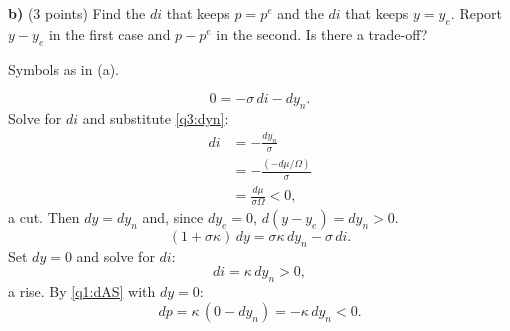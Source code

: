 \textbf{b)} (3 points) Find the $di$ that keeps $p=p^e$ and the $di$ that keeps $y=y_e$. Report $y-y_e$ in the first case and $p-p^e$ in
the second. Is there a trade-off?
\resolespaco
\begin{sol}
\begin{notacao}
\item Symbols as in (a).
\end{notacao}
\begin{equation}
0=-\sigma\,di-dy_n . \nonumber
\end{equation}
Solve for $di$ and substitute \eqref{q3:dyn}:
\begin{align}
di&=-\frac{dy_n}{\sigma}\nonumber\\
&=-\frac{(-d\mu/\Omega)}{\sigma}\nonumber\\
&=\frac{d\mu}{\sigma\Omega}<0 , \label{q3:dips}
\end{align}
a cut. Then $dy=dy_n$ and, since $dy_e=0$, $d(y-y_e)=dy_n>0$.
\begin{equation}
(1+\sigma\kappa)\,dy=\sigma\kappa\,dy_n-\sigma\,di . \nonumber
\end{equation}
Set $dy=0$ and solve for $di$:
\begin{equation}
di=\kappa\,dy_n>0 , \label{q3:die}
\end{equation}
a rise. By \eqref{q1:dAS} with $dy=0$:
\begin{equation}
dp=\kappa\,(0-dy_n)=-\kappa\,dy_n<0 . \nonumber
\end{equation}
\end{sol}

